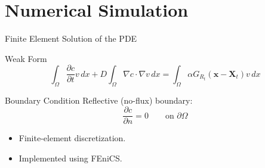 \section{Numerical Simulation}

\begin{frame}{Finite Element Solution of the PDE}

	\begin{block}{Weak Form}
		\[
			\int_\Omega
			\frac{\partial c}{\partial t}v\,dx
			+
			D
			\int_\Omega
			\nabla c \cdot \nabla v\,dx
			=
			\int_\Omega
			\alpha G_{R_t}(\mathbf{x}-\mathbf X_t)v\,dx
		\]
	\end{block}

	\begin{alertblock}{Boundary Condition}
		Reflective (no-flux) boundary:
		\[
			\frac{\partial c}{\partial n}=0
			\qquad \text{on } \partial\Omega
		\]
	\end{alertblock}

	\begin{itemize}
		\item Finite-element discretization.
		\item Implemented using FEniCS.
	\end{itemize}

\end{frame}

